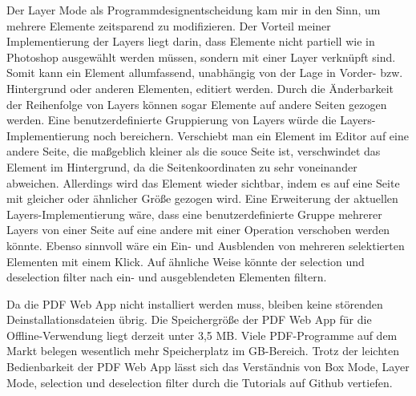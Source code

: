 \par
Der Layer Mode als Programmdesignentscheidung kam mir in den Sinn, um mehrere Elemente zeitsparend zu modifizieren. Der Vorteil meiner Implementierung der Layers liegt darin, dass Elemente nicht partiell wie in Photoshop ausgewählt werden müssen, sondern mit einer Layer verknüpft sind. Somit kann ein Element allumfassend, unabhängig von der Lage in Vorder- bzw. Hintergrund oder anderen Elementen, editiert werden. Durch die Änderbarkeit der Reihenfolge von Layers können sogar Elemente auf andere Seiten gezogen werden. Eine benutzerdefinierte Gruppierung von Layers würde die Layers-Implementierung noch bereichern. Verschiebt man ein Element im Editor auf eine andere Seite, die maßgeblich kleiner als die souce Seite ist, verschwindet das Element im Hintergrund, da die Seitenkoordinaten zu sehr voneinander abweichen. Allerdings wird das Element wieder sichtbar, indem es auf eine Seite mit gleicher oder ähnlicher Größe gezogen wird. Eine Erweiterung der aktuellen Layers-Implementierung wäre, dass eine benutzerdefinierte Gruppe mehrerer Layers von einer Seite auf eine andere mit einer Operation verschoben werden könnte. Ebenso sinnvoll wäre ein Ein- und Ausblenden von mehreren selektierten Elementen mit einem Klick. Auf ähnliche Weise könnte der selection und deselection filter nach ein- und ausgeblendeten Elementen filtern. 
\par   
Da die PDF Web App nicht installiert werden muss, bleiben keine störenden Deinstallationsdateien übrig. Die Speichergröße der PDF Web App für die Offline-Verwendung liegt derzeit unter 3,5 MB. Viele PDF-Programme auf dem Markt belegen wesentlich mehr Speicherplatz im GB-Bereich. Trotz der leichten Bedienbarkeit der PDF Web App lässt sich das Verständnis von Box Mode, Layer Mode, selection und deselection filter durch die Tutorials auf Github vertiefen.

